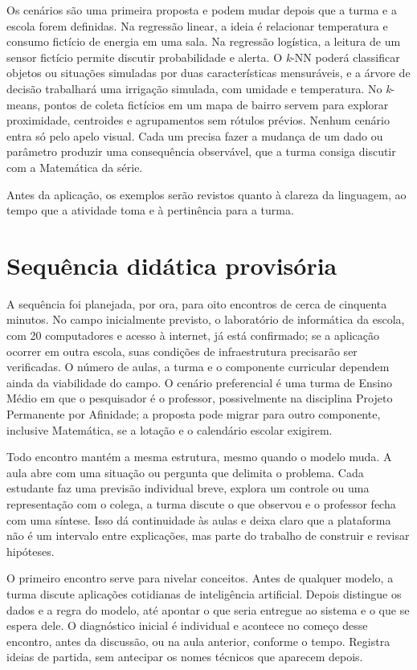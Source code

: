 Os cenários são uma primeira proposta e podem mudar depois que a turma e a escola forem definidas. Na regressão linear, a ideia é relacionar temperatura e consumo fictício de energia em uma sala. Na regressão logística, a leitura de um sensor fictício permite discutir probabilidade e alerta. O \textit{k}-NN poderá classificar objetos ou situações simuladas por duas características mensuráveis, e a árvore de decisão trabalhará uma irrigação simulada, com umidade e temperatura. No \textit{k}-means, pontos de coleta fictícios em um mapa de bairro servem para explorar proximidade, centroides e agrupamentos sem rótulos prévios. Nenhum cenário entra só pelo apelo visual. Cada um precisa fazer a mudança de um dado ou parâmetro produzir uma consequência observável, que a turma consiga discutir com a Matemática da série.

Antes da aplicação, os exemplos serão revistos quanto à clareza da linguagem, ao tempo que a atividade toma e à pertinência para a turma.

\section{Sequência didática provisória}

A sequência foi planejada, por ora, para oito encontros de cerca de cinquenta minutos. No campo inicialmente previsto, o laboratório de informática da escola, com 20 computadores e acesso à internet, já está confirmado; se a aplicação ocorrer em outra escola, suas condições de infraestrutura precisarão ser verificadas. O número de aulas, a turma e o componente curricular dependem ainda da viabilidade do campo. O cenário preferencial é uma turma de Ensino Médio em que o pesquisador é o professor, possivelmente na disciplina Projeto Permanente por Afinidade; a proposta pode migrar para outro componente, inclusive Matemática, se a lotação e o calendário escolar exigirem.

Todo encontro mantém a mesma estrutura, mesmo quando o modelo muda. A aula abre com uma situação ou pergunta que delimita o problema. Cada estudante faz uma previsão individual breve, explora um controle ou uma representação com o colega, a turma discute o que observou e o professor fecha com uma síntese. Isso dá continuidade às aulas e deixa claro que a plataforma não é um intervalo entre explicações, mas parte do trabalho de construir e revisar hipóteses.

O primeiro encontro serve para nivelar conceitos. Antes de qualquer modelo, a turma discute aplicações cotidianas de inteligência artificial. Depois distingue os dados e a regra do modelo, até apontar o que seria entregue ao sistema e o que se espera dele. O diagnóstico inicial é individual e acontece no começo desse encontro, antes da discussão, ou na aula anterior, conforme o tempo. Registra ideias de partida, sem antecipar os nomes técnicos que aparecem depois.

